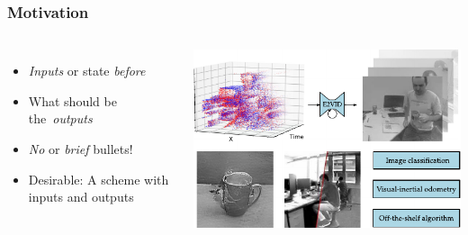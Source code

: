 \begin{frame}
  \frametitle{Motivation}
  \begin{columns}
    \begin{itemize}
        \item \emph{Inputs} or state \emph{before}
        \item What should be the~\emph{outputs}
        \item \emph{No} or \emph{brief} bullets!
        \item Desirable: A scheme with inputs and outputs
    \end{itemize}
     
    \includegraphics[width=\textwidth]{img/template-Teaser.pdf}
  \end{columns}
\end{frame}






